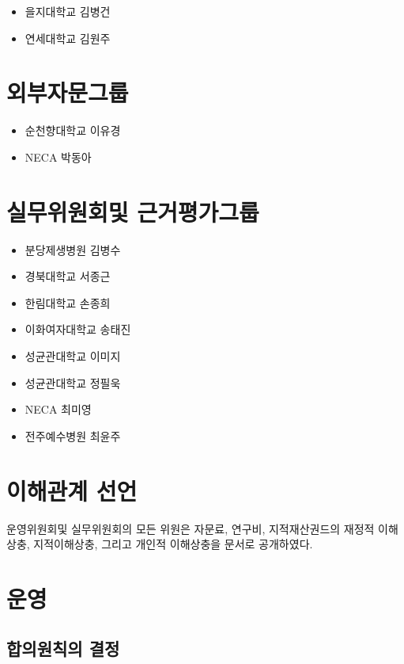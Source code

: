 \documentclass[]{book}
\providecommand{\tightlist}{%
  \setlength{\itemsep}{0pt}\setlength{\parskip}{0pt}}
\begin{document}
\begin{itemize}
\tightlist
\item
  을지대학교 김병건
\item
  연세대학교 김원주
\end{itemize}

\hypertarget{section-8}{%
\section{외부자문그룹}\label{section-8}}

\begin{itemize}
\tightlist
\item
  순천향대학교 이유경
\item
  NECA 박동아
\end{itemize}

\hypertarget{section-9}{%
\section{실무위원회및 근거평가그룹}\label{section-9}}

\begin{itemize}
\tightlist
\item
  분당제생병원 김병수
\item
  경북대학교 서종근
\item
  한림대학교 손종희
\item
  이화여자대학교 송태진
\item
  성균관대학교 이미지
\item
  성균관대학교 정필욱
\item
  NECA 최미영
\item
  전주예수병원 최윤주
\end{itemize}

\hypertarget{section-10}{%
\section{이해관계 선언}\label{section-10}}

운영위원회및 실무위원회의 모든 위원은 자문료, 연구비, 지적재산권드의 재정적 이해상충, 지적이해상충, 그리고 개인적 이해상충을 문서로 공개하였다.

\hypertarget{section-11}{%
\section{운영}\label{section-11}}

\hypertarget{section-12}{%
\subsection{합의원칙의 결정}\label{section-12}}
\end{document}
